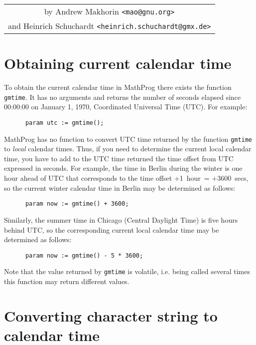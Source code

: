 \documentclass[11pt]{report}
\begin{document}
\noindent\hfil
\begin{tabular}{c}
by Andrew Makhorin \verb|<mao@gnu.org>|\\
and Heinrich Schuchardt \verb|<heinrich.schuchardt@gmx.de>|\\
\end{tabular}

\section{Obtaining current calendar time}
\label{gmtime}

To obtain the current calendar time in MathProg there exists the
function {\tt gmtime}. It has no arguments and returns the number of
seconds elapsed since 00:00:00 on January 1, 1970, Coordinated
Universal Time (UTC). For example:

\begin{verbatim}
      param utc := gmtime();
\end{verbatim}

MathProg has no function to convert UTC time returned by the function
{\tt gmtime} to {\it local} calendar times. Thus, if you need to
determine the current local calendar time, you have to add to the UTC
time returned the time offset from UTC expressed in seconds. For
example, the time in Berlin during the winter is one hour ahead of UTC
that corresponds to the time offset +1~hour~= +3600~secs, so the
current winter calendar time in Berlin may be determined as follows:

\begin{verbatim}
      param now := gmtime() + 3600;
\end{verbatim}

\noindent Similarly, the summer time in Chicago (Central Daylight Time)
is five hours behind UTC, so the corresponding current local calendar
time may be determined as follows:

\begin{verbatim}
      param now := gmtime() - 5 * 3600;
\end{verbatim}

Note that the value returned by {\tt gmtime} is volatile, i.e. being
called several times this function may return different values.

\section{Converting character string to calendar time}
\label{str2time}
\end{document}
